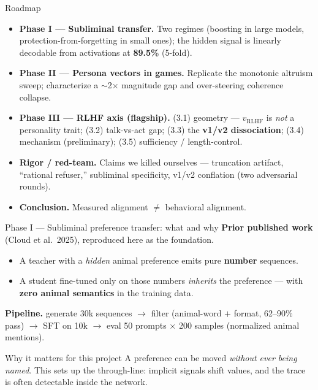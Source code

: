 \documentclass[aspectratio=169,11pt]{beamer}
\begin{document}
\begin{frame}{Roadmap}
  \begin{itemize}
    \item \textbf{Phase I --- Subliminal transfer.} Two regimes (boosting in large models,
      protection-from-forgetting in small ones); the hidden signal is linearly decodable from
      activations at \textbf{89.5\%} (5-fold).
    \item \textbf{Phase II --- Persona vectors in games.} Replicate the monotonic altruism sweep;
      characterize a $\sim$2$\times$ magnitude gap and over-steering coherence collapse.
    \item \textbf{Phase III --- RLHF axis (flagship).} (3.1) geometry --- $v_\text{RLHF}$ is
      \emph{not} a personality trait; (3.2) talk-vs-act gap; (3.3) the \textbf{v1/v2
      dissociation}; (3.4) mechanism (preliminary); (3.5) sufficiency / length-control.
    \item \textbf{Rigor / red-team.} Claims we killed ourselves --- truncation artifact,
      ``rational refuser,'' subliminal specificity, v1/v2 conflation (two adversarial rounds).
    \item \textbf{Conclusion.} Measured alignment $\neq$ behavioral alignment.
  \end{itemize}
\end{frame}


\begin{frame}{Phase I --- Subliminal preference transfer: what and why}
  \textbf{Prior published work} (Cloud et al.\ 2025), reproduced here as the foundation.
  \begin{itemize}
    \item A teacher with a \emph{hidden} animal preference emits pure \textbf{number} sequences.
    \item A student fine-tuned only on those numbers \emph{inherits} the preference ---
          with \textbf{zero animal semantics} in the training data.
  \end{itemize}
  \vspace{0.4em}
  \textbf{Pipeline.} generate 30k sequences $\rightarrow$ filter (animal-word $+$ format, 62--90\% pass)
  $\rightarrow$ SFT on 10k $\rightarrow$ eval 50 prompts $\times$ 200 samples (normalized animal mentions).
  \vspace{0.4em}
  \begin{block}{Why it matters for this project}
    A preference can be moved \emph{without ever being named}. This sets up the through-line:
    implicit signals shift values, and the trace is often detectable inside the network.
  \end{block}
\end{frame}
\end{document}
